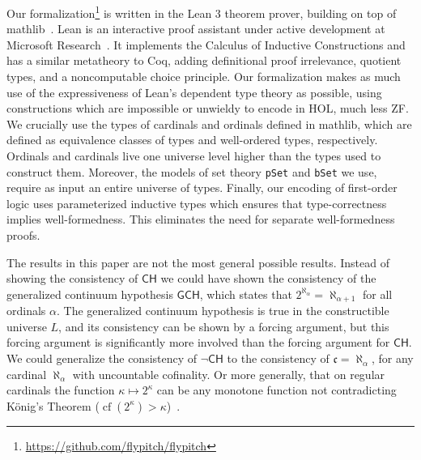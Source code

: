 \documentclass[sigplan,10pt,review, anonymous]{acmart}
\theoremstyle{definition}
\DeclareMathOperator{\cf}{cf}
\begin{document}

Our formalization\footnote{\url{https://github.com/flypitch/flypitch}} is written in the Lean 3 theorem prover, building on top of \textsf{mathlib}~\cite{mathlib}.
Lean is an interactive proof assistant under active development at Microsoft Research~\cite{de2015lean, ullrich2019counting}.
It implements the Calculus of Inductive Constructions and has a similar metatheory to Coq, adding definitional proof irrelevance, quotient types, and a noncomputable choice principle.
Our formalization makes as much use of the expressiveness of Lean's dependent type theory as possible, using constructions which are impossible or unwieldy to encode in HOL, much less ZF.
We crucially use the types of cardinals and ordinals defined in \textsf{mathlib}, which are defined as equivalence classes of types and well-ordered types, respectively. Ordinals and cardinals live one universe level higher than the types used to construct them.
Moreover, the models of set theory \lstinline{pSet} and \lstinline{bSet} we use, require as input an entire universe of types.
Finally, our encoding of first-order logic uses parameterized inductive types which ensures that type-correctness implies well-formedness. This eliminates the need for separate well-formedness proofs.

The results in this paper are not the most general possible results.
Instead of showing the consistency of $\mathsf{CH}$ we could have shown the consistency of the generalized continuum hypothesis $\mathsf{GCH}$, which states that $2^{\aleph_\alpha}=\aleph_{\alpha+1}$ for all ordinals $\alpha$.
The generalized continuum hypothesis is true in the constructible universe $L$, and its consistency can be shown by a forcing argument, but this forcing argument is significantly more involved than the forcing argument for $\mathsf{CH}$.
We could generalize the consistency of $\neg \mathsf{CH}$ to the consistency of $\mathfrak{c}=\aleph_\alpha$, for any cardinal $\aleph_\alpha$ with uncountable cofinality.
Or more generally, that on regular cardinals the function $\kappa\mapsto 2^\kappa$ can be any monotone function not contradicting K\"onig's Theorem ($\cf(2^\kappa)>\kappa$)~\cite{easton1970powers}.
\end{document}
